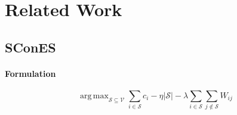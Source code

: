 \documentclass[12pt,a4paper]{article}
\newcommand{\sset}{\mathcal{S}}
\newcommand{\vset}{\mathcal{V}}
\DeclareMathOperator*{\argmax}{arg\,max}
\begin{document}
\section{Related Work}
\subsection{SConES}

\paragraph{Formulation}


\begin{equation}
\argmax_{\sset \subseteq \vset }  \sum_{i \in \sset} c_i - \eta |\sset|
- \lambda \sum_{i \in \sset} \sum_{j \notin \sset} W_{ij} 
\label{eq:scones}
\end{equation}
\end{document}
